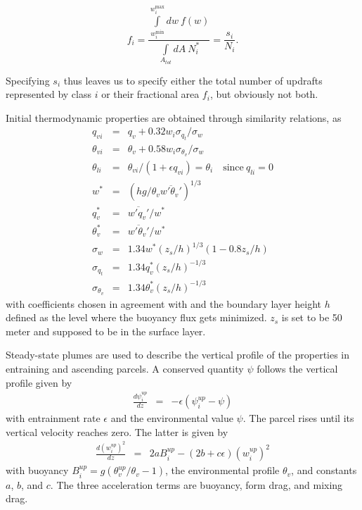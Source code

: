 \documentclass[dvipdfmx,a4paper,10pt]{article}
\begin{document}
\begin{equation}
 f_i = \frac{\int\limits_{w_i^{\mathrm{min}}}^{w_i^{\mathrm{max}}} dw~ f(w) }{ \int\limits_{A_{tot}} dA~N^*_i}= \frac{s_i }{ N_i}.
\end{equation}

Specifying $s_i$ thus leaves us to specify either the total number of updrafts represented by class $i$ or their fractional area $f_i$, but obviously not both.

Initial thermodynamic properties are obtained through similarity relations, as 
\begin{eqnarray}
 q_{vi}&=&q_{v}+0.32 w_i  \sigma_{q_t}/\sigma_w\\
 \theta_{vi}&=&\theta_{v}+0.58 w_i  \sigma_{\theta_v}/\sigma_w\\
  \theta_{li}&=&\theta_{vi}/(1+\epsilon q_{vi})=\theta_i \quad\mathrm{since}~q_{li}=0\\
  w^*&=&(hg/\theta_v \overline{w'\theta_v'})^{1/3}\\
  q_v^*&=&\overline{w'q_v'}/w^*\\
  \theta_v^*&=&\overline{w'\theta_v'}/w^*\\
 \sigma_w&=&1.34 w^*(z_s/h)^{1/3} (1-0.8z_s/h)\\
   \sigma_{q_t}&=&1.34 q_v^* (z_s/h)^{-1/3}\\
  \sigma_{\theta_v}&=&1.34\theta_v^* (z_s/h)^{-1/3}
\end{eqnarray}
with coefficients chosen in agreement with \cite{lenschow80} and the boundary layer height $h$ defined as the level where the buoyancy flux gets minimized. $z_s$ is set to be 50 meter and supposed to be in the surface layer. 

Steady-state plumes are used to describe the vertical profile of the properties in entraining and ascending parcels. A conserved quantity $\psi$ follows the vertical profile given by
\begin{eqnarray}\label{eqn:conserved}
 \frac{d\psi_i^{up} }{d z } &=& - \epsilon(\psi_i^{up} - \psi)
\end{eqnarray}
with entrainment rate $\epsilon$ and the environmental value $\psi$. The parcel rises until its vertical velocity reaches zero. The latter is given by
\begin{eqnarray}\label{eqn:w}
 \frac{d (w_i^{up})^2 }{d z } &=& 2aB^{up}_i- (2b+c\epsilon)(w_i^{up})^2
\end{eqnarray}
with buoyancy $B_i^{up}=g(\theta_v^{up}/\theta_v-1)$, the environmental profile $\theta_v$, and constants $a$, $b$, and $c$. The three acceleration terms are buoyancy, form drag, and mixing drag. 
\end{document}
